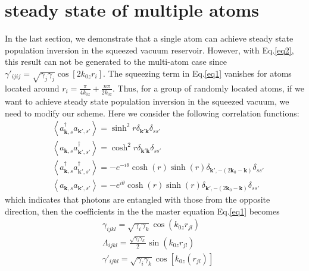 \documentclass[aps,showpacs,twocolumn,twoside,groupedaddress]{revtex4}
\let\vec\bm
\begin{document}

\section{steady state of multiple atoms}
In the last section, we demonstrate that a single atom can achieve steady state population inversion in the squeezed vacuum reservoir. However, with Eq.\eqref{eq2}, this result can not be generated to the multi-atom case since $\gamma'_{ijij}=\sqrt{\gamma_{j}\gamma_{j}}\cos[2k_{0z}r_{i}]$. The squeezing term in Eq.\eqref{eq1} vanishes for atoms located around $r_i=\frac{\pi}{4k_{0z}}+\frac{n\pi}{2k_{0z}}$. Thus, for a group of randomly located atoms, if we want to achieve steady state population inversion in the squeezed vacuum, we need to modify our scheme. Here we consider the following correlation functions:
\begin{equation}
\label{eq0b}
\begin{split}
& \left\langle a_{\vec{k},s}^{\dagger}a_{\vec{k}',s'}\right\rangle =\sinh^{2}r\delta_{\vec{k}'\vec{k}}\delta_{ss'} \\
& \left\langle a_{\vec{k},s}a_{\vec{k}',s'}^{\dagger}\right\rangle =\cosh^{2}r\delta_{\vec{k}'\vec{k}}\delta_{ss'}\\
& \left\langle a_{\vec{k},s}^{\dagger}a_{\vec{k}',s'}^{\dagger}\right\rangle =-e^{-i\theta}\cosh(r)\sinh(r)\delta_{\vec{k}',-(2\vec{k}_{0}-\vec{k})}\delta_{ss'}\\
&\left\langle a_{\vec{k},s}a_{\vec{k}',s'}\right\rangle =-e^{i\theta}\cosh(r)\sinh(r)\delta_{\vec{k}',-(2\vec{k}_{0}-\vec{k})}\delta_{ss'}
\end{split}
\end{equation}
which indicates that photons are entangled with those from the opposite direction, then the coefficients in the the master equation Eq.\eqref{eq1} becomes 
\begin{equation}
\label{eq2b}
\begin{split}
& \gamma_{ijkl}=\sqrt{\gamma_{i}\gamma_{k}}\cos(k_{0z}r_{jl}) \\
& \Lambda_{ijkl}=\frac{\sqrt{\gamma_{i}\gamma_{k}}}{2}\sin(k_{0z}r_{jl})\\
& \gamma'_{ijkl}=\sqrt{\gamma_{i}\gamma_{k}}\cos[k_{0z}(r_{jl})]
\end{split}
\end{equation}
\end{document}
